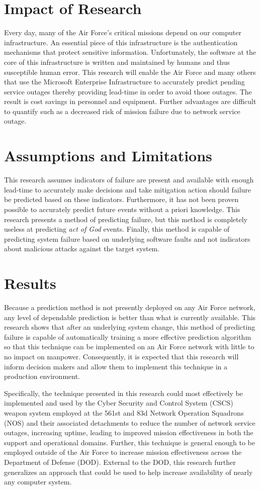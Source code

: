 \section{Impact of Research}
Every day, many of the Air Force's critical missions depend on our computer
infrastructure.  An essential piece of this infrastructure is the
authentication mechanisms that protect  sensitive information.
Unfortunately, the software at the core of this infrastructure is written and
maintained by humans and thus susceptible human error.  This research will
enable the Air Force and many others that use the Microsoft Enterprise
Infrastructure to accurately predict pending service outages thereby providing
lead-time in order to avoid those outages.  The result is cost savings in
personnel and equipment.  Further advantages are difficult to quantify such as
a decreased risk of mission failure due to network service outage.

\section{Assumptions and Limitations}
This research assumes indicators of failure are present and available with
enough lead-time to accurately make decisions and take mitigation action should
failure be predicted based on these indicators.  Furthermore, it has not been
proven possible to accurately predict future events without a priori knowledge.
This research presents a method of predicting failure, but this method is
completely useless at predicting \emph{act of God} events.  Finally, this
method is capable of predicting system failure based on underlying software
faults and not indicators about malicious attacks against the target system.

\section{Results}
Because a prediction method is not presently deployed on any Air Force network,
any level of dependable prediction is better than what is currently
available.  This research shows that after an underlying system change, this
method of predicting failure is capable of automatically training a more
effective prediction algorithm so that this technique can be implemented on an
Air Force network with little to no impact on manpower.  Consequently, it is
expected that this research will inform decision makers and allow them to
implement this technique in a production environment.

Specifically, the technique presented in this research could most effectively
be implemented and used by the Cyber Security and Control System (CSCS) weapon
system employed at the 561st and 83d Network Operation Squadrons (NOS) and
their associated detachments to reduce the number of network service outages,
increasing uptime, leading to improved mission effectiveness in both the
support and operational domains.  Further, this technique is general enough to
be employed outside of the Air Force to increase mission effectiveness across
the Department of Defense (DOD).  External to the DOD, this research further
generalizes an approach that could be used to help increase availability of
nearly any computer system.
